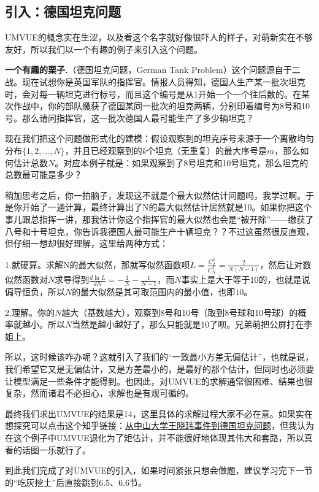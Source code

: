 \documentclass[10pt, a4paper]{article}
\begin{document}
\subsection{引入：德国坦克问题}

 UMVUE的概念实在生涩，以及看这个名字就好像很吓人的样子，对萌新实在不够友好，所以我们以一个有趣的例子来引入这个问题。\\\par
\textbf{一个有趣的栗子.}（德国坦克问题，German Tank Problem）这个问题源自于二战。现在试想你是英国军队的指挥官。情报人员得知，德国人生产某一批次坦克时，会对每一辆坦克进行标号，而且这个编号是从1开始一个一个往后数的。在某次作战中，你的部队缴获了德国某同一批次的坦克两辆，分别印着编号为8号和10号。那么请问指挥官，这一批次德国人最可能生产了多少辆坦克？\\\par
现在我们把这个问题做形式化的建模：假设观察到的坦克序号来源于一个离散均匀分布$\{1,2, \ldots, N\}$，并且已经观察到的$k$个坦克（无重复）的最大序号是$m$，那么如何估计总数$N$。对应本例子就是：如果观察到了8号坦克和10号坦克，那么坦克的总数最可能是多少？\par
稍加思考之后，你一拍脑子，发现这不就是个最大似然估计问题吗，我学过啊。于是你开始了一通计算，最终计算出了N的最大似然估计居然就是10。如果你把这个事儿跟总指挥一讲，那我估计你这个指挥官的最大似然也会是“被开除”——缴获了八号和十号坦克，你告诉我德国人最可能生产十辆坦克？？不过这虽然很反直观，但仔细一想却很好理解，这里给两种方式：\\\par
1.就硬算。求解N的最大似然，那就写似然函数呗$L=\frac{C^2_2}{C^2_N}=\frac{2}{N(N-1)}$，然后让对数似然函数对$N$求导得到$\frac{d\ln{L} }{dN}=-\frac{1}{N}-\frac{1}{N-1}$，而$N$事实上是大于等于$10$的，也就是说偏导恒负，所以$N$的最大似然是其可取范围内的最小值，也即$10$。\par
2.理解。你的$N$越大（基数越大），观察到$8$号和$10$号（取到8号球和10号球）的概率就越小。所以$N$当然是越小越好了，那么只能就是$10$了呗。兄弟萌把公屏打在李姐上。\\\par
所以，这时候该咋办呢？这就引入了我们的“一致最小方差无偏估计”，也就是说，我们希望它又是无偏估计，又是方差最小的，是最好的那个估计，但同时也必须要让模型满足一些条件才能得到。也因此，对UMVUE的求解通常很困难、结果也很复杂，然而诸君不必担心，求解也是有规可循的。\par
最终我们求出UMVUE的结果是14，这里具体的求解过程大家不必在意。如果实在想探究可以点击这个知乎链接：\href{https://zhuanlan.zhihu.com/p/158085371}{从中山大学王晓玮事件到德国坦克问题}，但我认为在这个例子中UMVUE退化为了矩估计，并不能很好地体现其伟大和套路，所以真看的话图一乐就行了。\par
到此我们完成了对UMVUE的引入，如果时间紧张只想会做题，建议学习完下一节的“吃灰挖土”后直接跳到6.5、6.6节。
\end{document}
